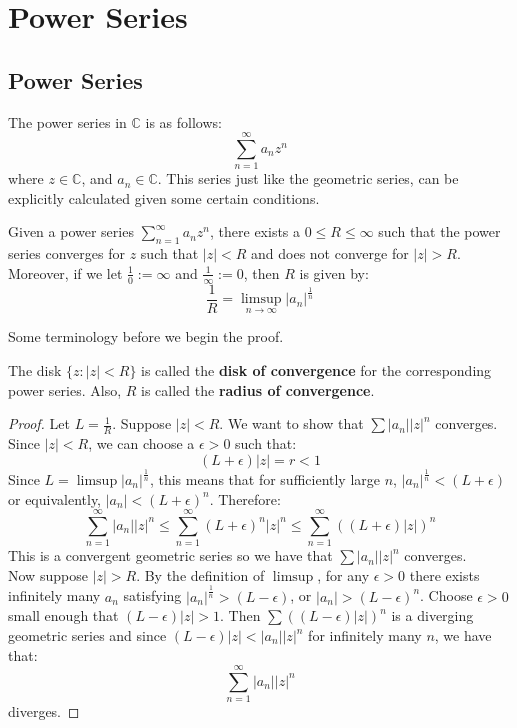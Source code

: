 \chapter{Power Series}

\section{Power Series}

The power series in $\mathbb{C}$ is as follows:
\[\sum_{n=1}^{\infty} a_nz^n\]
where $z\in\mathbb{C}$, and $a_n\in\mathbb{C}$. This series just like the geometric
series, can be explicitly calculated given some certain conditions.

\begin{theorem}
    Given a power series $\sum_{n=1}^{\infty} a_nz^n$, there exists a $0\leq R\leq\infty$ such that
    the power series converges for $z$ such that $|z|<R$ and does not converge for $|z|>R$. Moreover,
    if we let $\frac{1}{0}:=\infty$ and $\frac{1}{\infty}:=0$, then $R$ is given by:
    \[ \frac{1}{R} = \limsup\limits_{n\to\infty}|a_n|^{\frac{1}{n}} \]
\end{theorem}

Some terminology before we begin the proof.
\begin{definition}
    The disk $\{z: |z|<R\}$ is called the \textbf{disk of convergence} for the corresponding power series. Also,
    $R$ is called the \textbf{radius of convergence}.
\end{definition}

\begin{proof}
    Let $L = \frac{1}{R}$. Suppose $|z| < R$. We want to show that $\sum |a_n||z|^n$ converges. Since $|z|<R$,
    we can choose a $\epsilon>0$ such that:
    \[ (L+\epsilon)|z| = r < 1 \]
    Since $L = \limsup|a_n|^{\frac{1}{n}}$, this means that for sufficiently large $n$, $|a_n|^{\frac{1}{n}} <
    (L+\epsilon)$ or equivalently, $|a_n| < (L+\epsilon)^n$. Therefore:
    \[ \sum_{n=1}^{\infty} |a_n||z|^n \leq \sum_{n=1}^{\infty}(L+\epsilon)^n|z|^n \leq \sum_{n=1}^{\infty} 
        ((L+\epsilon)|z|)^n \]
    This is a convergent geometric series so we have that $\sum |a_n||z|^n$ converges.\\
    Now suppose $|z|>R$. By the definition of $\limsup$, for any $\epsilon>0$ there exists infinitely many
    $a_n$ satisfying $|a_n|^{\frac{1}{n}} > (L-\epsilon)$, or $|a_n| > (L-\epsilon)^n$. Choose $\epsilon>0$ small
    enough that $(L-\epsilon)|z|>1$. Then $\sum ((L-\epsilon)|z|)^n$ is a diverging geometric series and since
    $(L-\epsilon)|z| < |a_n||z|^n$ for infinitely many $n$, we have that:
    \[ \sum_{n=1}^{\infty} |a_n||z|^n \]
    diverges.
\end{proof}

